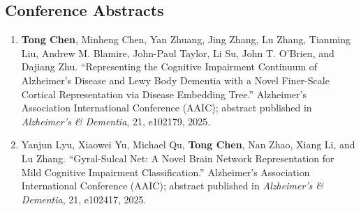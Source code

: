 \subsection*{Conference Abstracts}
\begin{enumerate}
  \item \textbf{Tong Chen}, Minheng Chen, Yan Zhuang, Jing Zhang, Lu Zhang, Tianming Liu,
        Andrew M. Blamire, John-Paul Taylor, Li Su, John T. O'Brien, and Dajiang Zhu.
        ``Representing the Cognitive Impairment Continuum of Alzheimer's Disease and Lewy
        Body Dementia with a Novel Finer-Scale Cortical Representation via Disease
        Embedding Tree.'' Alzheimer's Association International Conference (AAIC); abstract
        published in \textit{Alzheimer's \& Dementia}, 21, e102179, 2025.
  \item Yanjun Lyu, Xiaowei Yu, Michael Qu, \textbf{Tong Chen}, Nan Zhao, Xiang Li, and
        Lu Zhang. ``Gyral-Sulcal Net: A Novel Brain Network Representation for Mild
        Cognitive Impairment Classification.'' Alzheimer's Association International
        Conference (AAIC); abstract published in \textit{Alzheimer's \& Dementia}, 21,
        e102417, 2025.
\end{enumerate}

